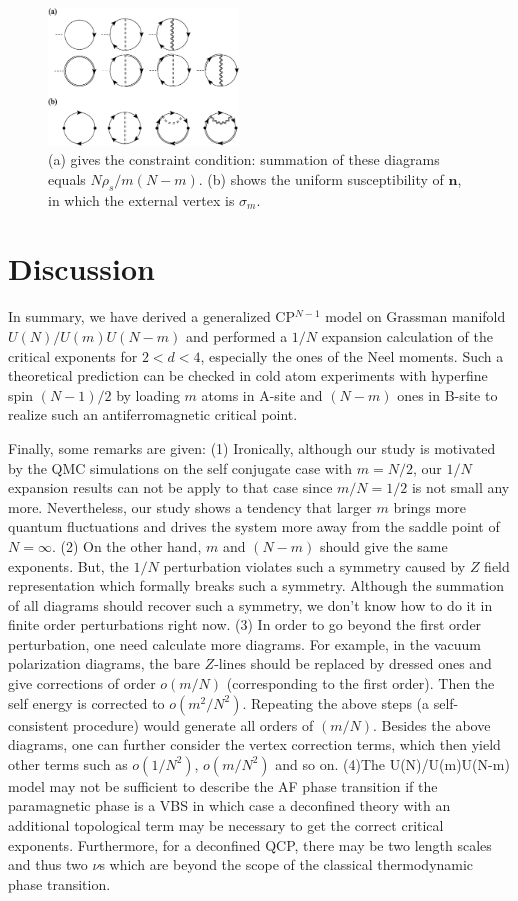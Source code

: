 \documentclass[aps,twocolumn,superscriptaddress]{revtex4-1}
\newcommand{\bn}{\mathbf{n}}
\begin{document}
\begin{figure}
\includegraphics[width=0.45\textwidth]{suscept.eps}
\caption{\label{fig:suscept} (a) gives the constraint condition: summation of these diagrams equals $N\rho_s/m(N-m)$. (b) shows the uniform susceptibility of $\bn$, in which the external vertex is $\sigma_m$. }
\end{figure}

\section{Discussion}
In summary, we have derived a generalized CP$^{N-1}$ model on Grassman manifold $U(N)/U(m)U(N-m)$ and performed a $1/N$
expansion calculation of the critical exponents for $2<d<4$, especially the ones of the Neel moments. Such a theoretical prediction can be checked in cold atom experiments with hyperfine spin $(N-1)/2$ by loading $m$ atoms in A-site and $(N-m)$ ones in B-site to realize such an antiferromagnetic critical point.

Finally, some remarks are given:
(1) Ironically, although our study is motivated by the QMC simulations on the self conjugate case with $m=N/2$, our $1/N$ expansion results can not be apply to that case since $m/N=1/2$ is not small any more. Nevertheless, our study shows a tendency that larger $m$ brings more quantum fluctuations and drives the system more away from the saddle point of $N=\infty$.
(2) On the other hand, $m$ and $(N-m)$ should give the same exponents. But, the $1/N$ perturbation violates such a symmetry caused by $Z$ field representation which formally breaks such a symmetry. Although the summation of all diagrams should recover such a symmetry, we don't know how to do it in finite order perturbations right now.
(3) In order to go beyond the first order perturbation, one need calculate more diagrams. For example, in the vacuum polarization diagrams, the bare $Z$-lines should be replaced by dressed ones and give corrections of order $o(m/N)$ (corresponding to the first order). Then the self energy is corrected to $o(m^2/N^2)$. Repeating the above steps (a self-consistent procedure) would generate all orders of $(m/N)$. Besides the above diagrams, one can further consider the vertex correction terms, which then yield other terms such as $o(1/N^2)$, $o(m/N^2)$ and so on.
(4)The U(N)/U(m)U(N-m) model may not be sufficient to
describe the AF phase transition if the paramagnetic phase is a VBS in which case a deconfined theory with an additional
topological term may be necessary to get the correct critical exponents. \cite{senthil2004,motrunich2004} 
Furthermore, for a deconfined QCP, there may be two
length scales and thus two $\nu$s \cite{Shao2016} which are beyond the scope of the classical thermodynamic phase transition. 
\end{document}
